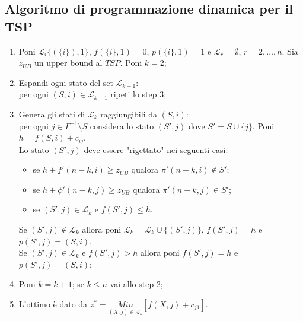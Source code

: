 \subsection{Algoritmo di programmazione dinamica per il TSP}
\begin{enumerate}
	\item Poni $\mathscr{L}_{i}\{(\{i\}),1\}$, $f(\{i\},1)=0$, $p(\{i\},1)=1$ e $\mathscr{L}_{r}=\emptyset$, $r=2,\dots,n$. Sia $z_{UB}$ un upper bound al $TSP$. Poni $k=2$;
	\item Espandi ogni stato del set $\mathscr{L}_{k-1}$:\\
	per ogni $(S,i)\in\mathscr{L}_{k-1}$ ripeti lo step 3;
	\item Genera gli stati di $\mathscr{L}_{k}$ raggiungibili da $(S,i)$:\\
	per ogni $j\in\Gamma^{-1}\setminus S$ considera lo stato $(S',j)$ dove $S'=S\cup\{j\}$. Poni $h=f(S,i)+c_{ij}$.\\
	Lo stato $(S',j)$ deve essere "rigettato" nei seguenti casi:
	\begin{itemize}
		\item se $h+f'(n-k,i)\ge z_{UB}$ qualora $\pi'(n-k,i)\notin S'$;
		\item se $h+\phi'(n-k,j)\ge z_{UB}$ qualora $\pi'(n-k,j)\in S'$;
		\item se $(S',j)\in\mathscr{L}_{k}$ e $f(S',j)\le h$.
	\end{itemize}
	Se $(S',j)\notin\mathscr{L}_{k}$ allora poni $\mathscr{L}_{k}=\mathscr{L}_{k}\cup\{(S',j)\}$, $f(S',j)=h$ e $p(S',j)=(S,i)$.\\
	Se $(S',j)\in\mathscr{L}_{k}$ e $f(S',j)>h$ allora poni $f(S',j)=h$ e $p(S',j)=(S,i)$;
	\item Poni $k=k+1$; se $k\le n$ vai allo step 2;
	\item L'ottimo è dato da $z^{*}=\underset{(X,j)\in\mathscr{L}_{k}}{Min}[f(X,j)+c_{j1}]$.
\end{enumerate}
